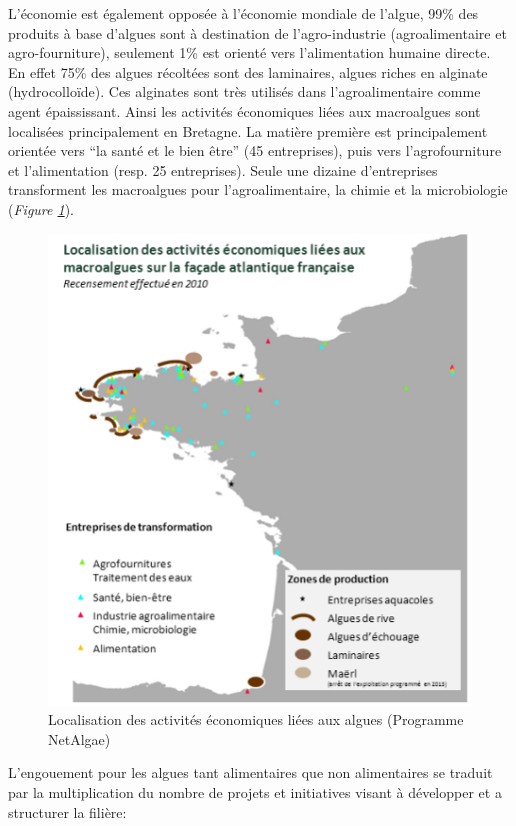 \documentclass[
]{book}
\begin{document}
L'économie est également opposée à l'économie mondiale de l'algue, 99\% des produits à base d'algues sont à destination de l'agro-industrie (agroalimentaire et agro-fourniture), seulement 1\% est orienté vers l'alimentation humaine directe. En effet 75\% des algues récoltées sont des laminaires, algues riches en alginate (hydrocolloïde). Ces alginates sont très utilisés dans l'agroalimentaire comme agent épaississant.
Ainsi les activités économiques liées aux macroalgues sont localisées principalement en Bretagne. La matière première est principalement orientée vers ``la santé et le bien être'' (45 entreprises), puis vers l'agrofourniture et l'alimentation (resp. 25 entreprises). Seule une dizaine d'entreprises transforment les macroalgues pour l'agroalimentaire, la chimie et la microbiologie (\emph{Figure \ref{fig:algueatlantique}}).

\begin{figure}

{\centering \includegraphics{images/activite_algue_atlantique} 

}

\caption{Localisation des activités économiques liées aux algues (Programme NetAlgae)}\label{fig:algueatlantique}
\end{figure}

L'engouement pour les algues tant alimentaires que non alimentaires se traduit par la multiplication du nombre de projets et initiatives visant à développer et a structurer la filière:
\end{document}
